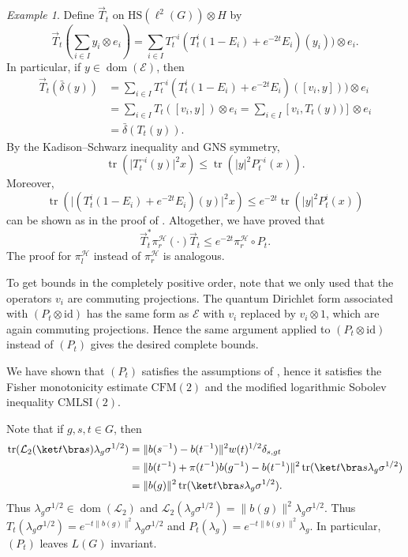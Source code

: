 \documentclass[12pt,a4paper]{amsart}
\newcommand{\1}{\mathds{1}}
\newcommand{\tr}{\operatorname{tr}}
\newcommand{\E}{\mathcal E}
\renewcommand{\H}{\mathcal H}
\renewcommand{\L}{\mathcal L}
\newcommand{\dom}{\operatorname{dom}}
\newcommand{\id}{\mathrm{id}}
\newcommand{\abs}[1]{\lvert#1\rvert}
\newcommand{\norm}[1]{\lVert#1\rVert}
\theoremstyle{plain}
\theoremstyle{definition}
\theoremstyle{remark}
\newtheorem{example}[proposition]{Example}
\begin{document}
\begin{example}
    Define $\vec T_t$ on $\mathrm{HS}(\ell^2(G))\otimes H$ by
    \begin{equation*}
        \vec T_t\left(\sum_{i\in I}y_i\otimes e_i\right)=\sum_{i\in I}T_t^{\neg i}(T_t^i(1-E_i)+e^{-2t}E_i)(y_i))\otimes e_i.
    \end{equation*}
    In particular, if $y\in\dom(\E)$, then
    \begin{align*}
        \vec T_t(\bar\delta(y))&=\sum_{i\in I}T_t^{\neg i}(T_t^i(1-E_i)+e^{-2t}E_i)([v_i,y]))\otimes e_i\\
        &=\sum_{i\in I}T_t([v_i,y])\otimes e_i=\sum_{i\in I}[v_i,T_t(y))]\otimes e_i\\
        &=\bar\delta(T_t(y)).
    \end{align*}
    By the Kadison--Schwarz inequality and GNS symmetry,
    \begin{equation*}
        \tr(\abs{T_t^{\neg i}(y)}^2x)\leq \tr(\abs{y}^2P_t^{\neg i}(x)).
    \end{equation*}
    Moreover,
    \begin{equation*}
        \tr(\abs{(T_t^i(1-E_i)+e^{-2t}E_i)(y)}^2x)\leq e^{-2t}\tr(\abs{y}^2P_t^i(x))
    \end{equation*}
    can be shown as in the proof of \cite[Corollary 3.17]{MWZ24}. Altogether, we have proved that
    \begin{equation*}
        \vec T_t^\ast \pi_r^\H(\cdot)\vec T_t\leq e^{-2t}\pi_r^\H\circ P_t.
    \end{equation*}
    The proof for $\pi_l^\H$ instead of $\pi_r^\H$ is analogous.

    To get bounds in the completely positive order, note that we only used that the operators $v_i$ are commuting projections. The quantum Dirichlet form associated with $(P_t\otimes \id)$ has the same form as $\E$ with $v_i$ replaced by $v_i\otimes 1$, which are again commuting projections. Hence the same argument applied to $(P_t\otimes \id)$ instead of $(P_t)$ gives the desired complete bounds.

    We have shown that $(P_t)$ satisfies the assumptions of , hence it satisfies the Fisher monotonicity estimate $\mathrm{CFM}(2)$ and the modified logarithmic Sobolev inequality $\mathrm{CMLSI}(2)$.

    Note that if $g,s,t\in G$, then
    \begin{align*}
        \tr(\L_2(\ket t\bra s)\lambda_g \sigma^{1/2})&=\norm{b(s^{-1})-b(t^{-1})}^2 w(t)^{1/2}\delta_{s,gt}\\
        &=\norm{b(t^{-1})+\pi(t^{-1})b(g^{-1})-b(t^{-1})}^2\tr(\ket t\bra s\lambda_g \sigma^{1/2})\\
        &=\norm{b(g)}^2\tr(\ket t\bra s\lambda_g \sigma^{1/2}).
    \end{align*}
    Thus $\lambda_g\sigma^{1/2}\in \dom(\L_2)$ and $\L_2(\lambda_g \sigma^{1/2})=\norm{b(g)}^2\lambda_g \sigma^{1/2}$. Thus $T_t(\lambda_g \sigma^{1/2})=e^{-t\norm{b(g)}^2}\lambda_g\sigma^{1/2}$ and $P_t(\lambda_g)=e^{-t\norm{b(g)}^2}\lambda_g$. In particular, $(P_t)$ leaves $L(G)$ invariant.


\end{example}
\end{document}
